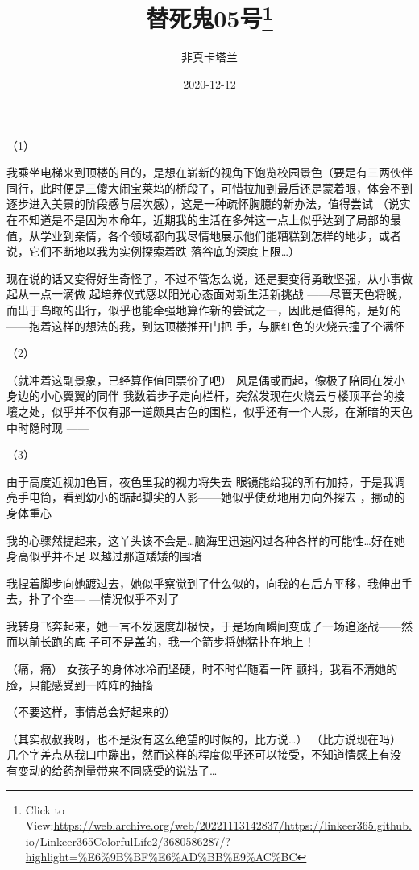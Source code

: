 \documentclass{article}
\title{替死鬼05号\footnote{Click to View:\url{https://web.archive.org/web/20221113142837/https://linkeer365.github.io/Linkeer365ColorfulLife2/3680586287/?highlight=%E6%9B%BF%E6%AD%BB%E9%AC%BC}}}
\author{非真卡塔兰}
\date{2020-12-12}
\begin{document}

\maketitle


\Large


﻿（1） 

我乘坐电梯来到顶楼的目的，是想在崭新的视角下饱览校园景色（要是有三两伙伴同行，此时便是三傻大闹宝莱坞的桥段了，可惜拉加到最后还是蒙着眼，体会不到逐步进入美景的阶段感与层次感），这是一种疏怀胸臆的新办法，值得尝试
（说实在不知道是不是因为本命年，近期我的生活在多舛这一点上似乎达到了局部的最值，从学业到亲情，各个领域都向我尽情地展示他们能糟糕到怎样的地步，或者说，它们不断地以我为实例探索着跌
落谷底的深度上限…） 

现在说的话又变得好生奇怪了，不过不管怎么说，还是要变得勇敢坚强，从小事做起从一点一滴做
\newpage
起培养仪式感以阳光心态面对新生活新挑战
——尽管天色将晚，而出于鸟瞰的出行，似乎也能牵强地算作新的尝试之一，因此是值得的，是好的
——抱着这样的想法的我，到达顶楼推开门把
手，与胭红色的火烧云撞了个满怀 


（2） 

（就冲着这副景象，已经算作值回票价了吧）
风是偶或而起，像极了陪同在发小身边的小心翼翼的同伴
我数着步子走向栏杆，突然发现在火烧云与楼顶平台的接壤之处，似乎并不仅有那一道颇具古色的围栏，似乎还有一个人影，在渐暗的天色中时隐时现
—— 


（3） 

由于高度近视加色盲，夜色里我的视力将失去
\newpage
眼镜能给我的所有加持，于是我调亮手电筒，看到幼小的踮起脚尖的人影——她似乎使劲地用力向外探去
，挪动的身体重心 

我的心骤然提起来，这丫头该不会是…脑海里迅速闪过各种各样的可能性…好在她身高似乎并不足
以越过那道矮矮的围墙 

我捏着脚步向她踱过去，她似乎察觉到了什么似的，向我的右后方平移，我伸出手去，扑了个空—
—情况似乎不对了 

我转身飞奔起来，她一言不发速度却极快，于是场面瞬间变成了一场追逐战——然而以前长跑的底
子可不是盖的，我一个箭步将她猛扑在地上！ 

（痛，痛）
女孩子的身体冰冷而坚硬，时不时伴随着一阵
颤抖，我看不清她的脸，只能感受到一阵阵的抽搐 

（不要这样，事情总会好起来的）
\newpage

（其实叔叔我呀，也不是没有这么绝望的时候的，比方说…）
（比方说现在吗）几个字差点从我口中蹦出，然而这样的程度似乎还可以接受，不知道情感上有没
有变动的给药剂量带来不同感受的说法了… 
\end{document}
